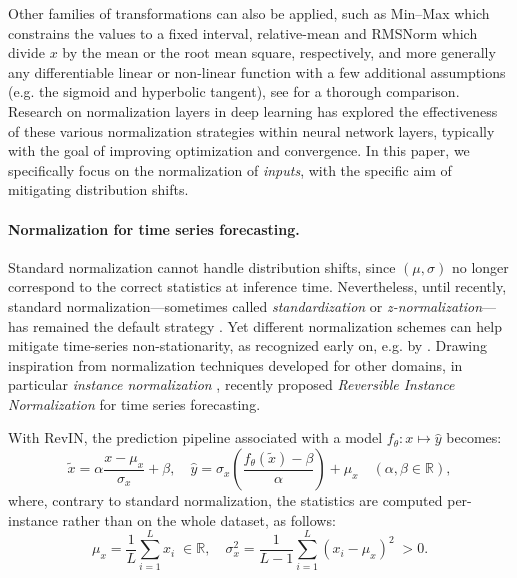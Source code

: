 Other families of transformations can also be applied, such as Min--Max \citep{adaptivenorm} which constrains the values to a fixed interval, relative-mean \citep{chronos1} and RMSNorm \citep{rms} which divide $x$ by the mean or the root mean square, respectively, and more generally any differentiable linear or non-linear function with a few additional assumptions (e.g. the sigmoid and hyperbolic tangent), see \citep{bhanja2018impact} for a thorough comparison. Research on normalization layers in deep learning has explored the effectiveness of these various normalization strategies within neural network layers, typically with the goal of improving optimization and convergence. In this paper, we specifically focus on the normalization of \textit{inputs}, with the specific aim of mitigating distribution shifts.


\paragraph{Normalization for time series forecasting.}
Standard normalization cannot handle distribution shifts, since $(\mu,\sigma)$ no longer correspond to the correct statistics at inference time. Nevertheless, until recently, standard normalization---sometimes called \textit{standardization} or \textit{z-normalization}---has remained the default strategy \citep{informer,dain}. Yet different normalization schemes can help mitigate time-series non-stationarity, as recognized early on, e.g. by \citet{adaptivenorm}.
Drawing inspiration from normalization techniques developed for other domains, in particular  \textit{instance normalization} \citep{instancenorm}, \citet{revin} recently proposed \textit{Reversible Instance Normalization} for time series forecasting.

With RevIN, the prediction pipeline associated with a model $f_\theta: x \mapsto \hat{y}$ becomes:
\begin{equation}
\tilde{{x}}=\alpha\frac{{x}-{\mu}_x}{{\sigma_x}}+\beta, \quad
\hat{y} = \sigma_x \left( \frac{f_\theta(\tilde{x}) - \beta}{\alpha} \right) + \mu_x \quad (\alpha,\beta \in \mathbb{R}),
\end{equation}
where, contrary to standard normalization, the statistics are computed per-instance rather than on the whole dataset, as follows:
\begin{equation}
\mu_x = \frac{1}{L}\sum_{i=1}^L x_i \;\in \mathbb{R}, \quad \sigma_x^2 = \frac{1}{L-1}\sum_{i=1}^L(x_i-\mu_x)^2\;>0.
\end{equation}

